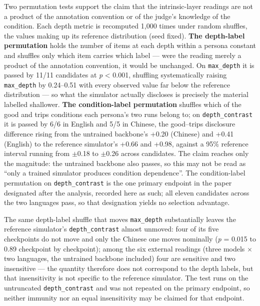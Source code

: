 \documentclass[letterpaper]{article}
\begin{document}
Two permutation tests \citep{ojala2010} support the claim that the intrinsic-layer readings are not a product of the annotation convention or of the judge's knowledge of the condition. Each depth metric is recomputed 1,000 times under random shuffles, the values making up its reference distribution (seed fixed). \textbf{The depth-label permutation} holds the number of items at each depth within a persona constant and shuffles only which item carries which label --- were the reading merely a product of the annotation convention, it would be unchanged. On \texttt{max\_depth} it is passed by 11/11 candidates at \textit{p} < 0.001, shuffling systematically raising \texttt{max\_depth} by 0.24--0.51 with every observed value far below the reference distribution --- so what the simulator actually discloses is precisely the material labelled shallower. \textbf{The condition-label permutation} shuffles which of the good and trips conditions each persona's two runs belong to; on \texttt{depth\_contrast} it is passed by 6/6 in English and 5/5 in Chinese, the good--trips disclosure difference rising from the untrained backbone's +0.20 (Chinese) and +0.41 (English) to the reference simulator's +0.66 and +0.98, against a 95\% reference interval running from $\pm$0.18 to $\pm$0.26 across candidates. The claim reaches only the magnitude: the untrained backbone also passes, so this may not be read as ``only a trained simulator produces condition dependence''. The condition-label permutation on \texttt{depth\_contrast} is the one primary endpoint in the paper designated after the analysis, recorded here as such; all eleven candidates across the two languages pass, so that designation yields no selection advantage.

The same depth-label shuffle that moves \texttt{max\_depth} substantially leaves the reference simulator's \texttt{depth\_contrast} almost unmoved: four of its five checkpoints do not move and only the Chinese one moves nominally (\textit{p} = 0.015 to 0.89 checkpoint by checkpoint); among the six external readings (three models $\times$ two languages, the untrained backbone included) four are sensitive and two insensitive --- the quantity therefore does not correspond to the depth labels, but that insensitivity is not specific to the reference simulator. The test runs on the untruncated \texttt{depth\_contrast} and was not repeated on the primary endpoint, so neither immunity nor an equal insensitivity may be claimed for that endpoint.
\end{document}
